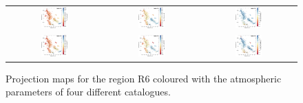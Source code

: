 \documentclass{aa}
\begin{document}
\begin{appendix}
\begin{figure}[htbp]
\begin{tabular}{ccc}
        \includegraphics[width=0.3\textwidth]{Plots/tsne_params/tsne_R6_Teff_StarHorse2.pdf} &
        \includegraphics[width=0.3\textwidth]{Plots/tsne_params/tsne_R6_logg_StarHorse2.pdf} &
        \includegraphics[width=0.3\textwidth]{Plots/tsne_params/tsne_R6_FeH_StarHorse2.pdf} \\
        \includegraphics[width=0.3\textwidth]{Plots/tsne_params/tsne_R6_Teff_XP-LAMOST.pdf} &
        \includegraphics[width=0.3\textwidth]{Plots/tsne_params/tsne_R6_logg_XP-LAMOST.pdf} &
        \includegraphics[width=0.3\textwidth]{Plots/tsne_params/tsne_R6_FeH_XP-LAMOST.pdf} \\
    \end{tabular}
    \caption{Projection maps for the region R6 coloured with the atmospheric parameters of four different catalogues.}
\end{figure}


\end{appendix}
\end{document}
